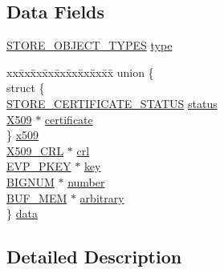 \subsection*{Data Fields}
\begin{DoxyCompactItemize}
\item 
\hyperlink{store_8h_a6bb65a33014a4e7be1346df78c513442}{S\+T\+O\+R\+E\+\_\+\+O\+B\+J\+E\+C\+T\+\_\+\+T\+Y\+P\+ES} \hyperlink{struct_s_t_o_r_e___o_b_j_e_c_t__st_a0b261321ba20ee1ecd391342e269717a}{type}
\item 
\begin{tabbing}
xx\=xx\=xx\=xx\=xx\=xx\=xx\=xx\=xx\=\kill
union \{\\
\>struct \{\\
\>\>\hyperlink{store_8h_ab88eccdcf659905ee5f32f7115ac4868}{STORE\_CERTIFICATE\_STATUS} \hyperlink{struct_s_t_o_r_e___o_b_j_e_c_t__st_afc3ee3aeaca1380703d5258b4ccc26bc}{status}\\
\>\>\hyperlink{crypto_2ossl__typ_8h_a4f666bde6518f95deb3050c54b408416}{X509} $\ast$ \hyperlink{struct_s_t_o_r_e___o_b_j_e_c_t__st_ac130c045af9259b1075263ec517ef59d}{certificate}\\
\>\} \hyperlink{struct_s_t_o_r_e___o_b_j_e_c_t__st_a831acef4629ef4499567bccd2d90e261}{x509}\\
\>\hyperlink{crypto_2ossl__typ_8h_ac8661d2485c2c8da5fd7dd26b846f4bf}{X509\_CRL} $\ast$ \hyperlink{struct_s_t_o_r_e___o_b_j_e_c_t__st_a34fe84e0f1ecba5f97d6b22eded9c633}{crl}\\
\>\hyperlink{crypto_2ossl__typ_8h_a2fca4fef9e4c7a2a739b1ea04acb56ce}{EVP\_PKEY} $\ast$ \hyperlink{struct_s_t_o_r_e___o_b_j_e_c_t__st_a9676ff622dd06d9ec9443920468c74bf}{key}\\
\>\hyperlink{crypto_2ossl__typ_8h_a6fb19728907ec6515e4bfb716bffa141}{BIGNUM} $\ast$ \hyperlink{struct_s_t_o_r_e___o_b_j_e_c_t__st_a13525af9d1d9a58577537e01cc64572a}{number}\\
\>\hyperlink{crypto_2ossl__typ_8h_aaea4d745bf2689d2009791186616bb3c}{BUF\_MEM} $\ast$ \hyperlink{struct_s_t_o_r_e___o_b_j_e_c_t__st_a4c1d5fbfbb1a626268c74e14826c4d2f}{arbitrary}\\
\} \hyperlink{struct_s_t_o_r_e___o_b_j_e_c_t__st_a967d5ce890e505b3f4bbe01efb2c6673}{data}\\

\end{tabbing}\end{DoxyCompactItemize}


\subsection{Detailed Description}


